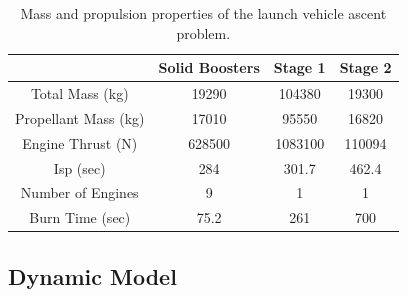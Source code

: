 \documentclass[10pt,final]{report}
\begin{document}
\begin{table}[h]
\centering
\caption{Mass and propulsion properties of the launch vehicle ascent
  problem. \label{table: launch vehicle properties}}
\begin{tabular}{|c|c|c|c|}
\hline
 & Solid Boosters & Stage 1 & Stage 2 \\
 \hline \hline
 Total Mass (kg) & 19290 & 104380 & 19300 \\
 \hline
 Propellant Mass (kg) & 17010 & 95550 & 16820 \\
 \hline
 Engine Thrust (N) & 628500 & 1083100 & 110094 \\
 \hline
 Isp (sec) & 284 & 301.7 & 462.4 \\
 \hline
 Number of Engines & 9 & 1 & 1 \\
 \hline
 Burn Time (sec) & 75.2 & 261 & 700 \\
 \hline
\end{tabular}
\end{table}

\subsection{Dynamic Model}
\end{document}
